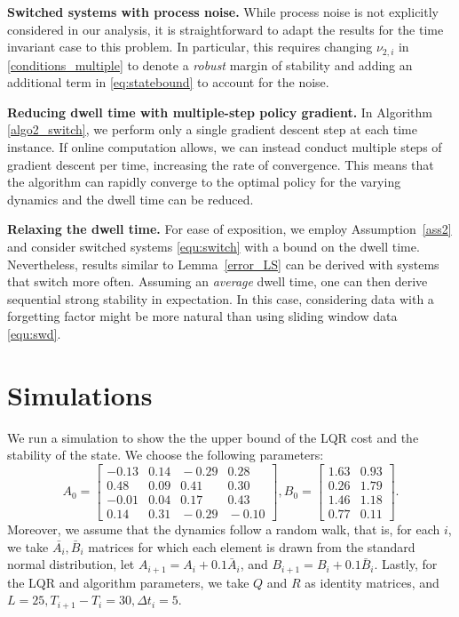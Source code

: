 \documentclass[letterpaper, 10 pt, conference]{ieeeconf}  %
\begin{document}
\textbf{Switched systems with process noise.} While process noise is not explicitly considered in our analysis, it is straightforward to adapt the results for the time invariant case \cite{zhao2025policy} to this problem. In particular, this requires changing $\nu_{2,i}$ in \eqref{conditions_multiple} to denote a \textit{robust} margin of stability and adding an additional term in \eqref{eq:statebound} to account for the noise. 

\textbf{Reducing dwell time with multiple-step policy gradient.} In Algorithm \ref{algo2_switch}, we perform only a single gradient descent step at each time instance. If online computation allows, we can instead conduct multiple steps of gradient descent per time, increasing the rate of convergence. This means that the algorithm can rapidly converge to the optimal policy for the varying dynamics and the dwell time can be reduced.

\textbf{Relaxing the dwell time.} For ease of exposition, we employ Assumption~\ref{ass2} and consider switched systems \eqref{equ:switch} with a bound on the dwell time. Nevertheless, results similar to Lemma~\ref{error_LS} can be derived  with systems that switch more often. Assuming an \textit{average} dwell time, one can then derive sequential strong stability in expectation. In this case, considering data with a forgetting factor might be more natural than using sliding window data \eqref{equ:swd}.








\section{Simulations}
We run a simulation to show the the upper bound of the LQR cost and the stability of the state. We choose the following parameters: 
\[ A_0 \!\!=\! \begin{bmatrix}
        -0.13 & 0.14 & \!\!-0.29 & 0.28 \\
        0.48 & 0.09 & 0.41 & 0.30 \\
        -0.01 & 0.04 & 0.17 & 0.43 \\
        0.14 & 0.31 & \!\!-0.29 & \!\!-0.10
        \end{bmatrix}\!\!, B_0 = \begin{bmatrix}
        1.63 & 0.93 \\
        0.26 & 1.79 \\
        1.46 & 1.18 \\
        0.77 & 0.11 
    \end{bmatrix}.\]
Moreover, we assume that the dynamics follow a random walk, that is, for each $i$, we take $\bar{A_i},\bar{B}_i$ matrices for which each element is drawn from the standard normal distribution, let
$A_{i+1} = A_i + 0.1\bar{A}_i$, and $B_{i+1} = B_i + 0.1\bar{B}_i.$
Lastly, for the LQR and algorithm parameters, we take $Q$ and $R$ as identity matrices, and
$L = 25, T_{i+1} - T_i = 30, \Delta t_i = 5.$
\end{document}
